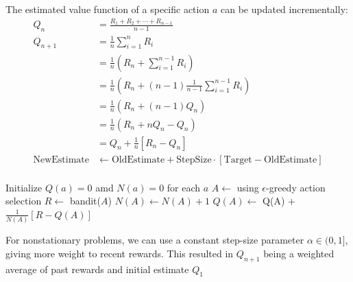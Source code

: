 The estimated value function of a specific action $a$ can be updated
incrementally:
\begin{align*}
    Q_n                & = \frac{R_1 + R_2 + \cdots + R_{n-1}}{n-1}                                                   \\
    Q_{n+1}            & = \frac{1}{n} \sum_{i=1}^{n} R_i                                                             \\
                       & = \frac{1}{n} \left( R_n + \sum_{i=1}^{n-1} R_i \right)                                      \\
                       & = \frac{1}{n} \left( R_n + (n-1)\frac{1}{n-1} \sum_{i=1}^{n-1} R_i \right)                   \\
                       & = \frac{1}{n} (R_n + (n-1) Q_n)                                                              \\
                       & = \frac{1}{n} (R_n + n Q_n - Q_n)                                                            \\
                       & = Q_n + \frac{1}{n} [ R_n - Q_n ]                                                            \\
    \text{NewEstimate} & \leftarrow \text{OldEstimate} + \text{StepSize} \cdot [ \text{Target} - \text{OldEstimate} ] \\
\end{align*}

\begin{algorithm}[H]
    \caption{A simple bandit algorithm}
    \begin{algorithmic}[1]
        \State Initialize $Q(a) = 0$ amd $N(a) = 0$ for each $a$
        \State $A \leftarrow$ using $\epsilon$-greedy action selection
        \State $R \leftarrow$ bandit($A$)
        \State $N(A) \leftarrow N(A) + 1$
        \State $Q(A) \leftarrow$ Q(A) + $\frac{1}{N(A)} [ R - Q(A) ]$
        \EndFor
    \end{algorithmic}
\end{algorithm}

\noindent For nonstationary problems, we can use a constant step-size parameter $\alpha
    \in (0, 1]$, giving more weight to recent rewards. This resulted in $Q_{n+1}$
being a weighted average of past rewards and initial estimate $Q_1$

